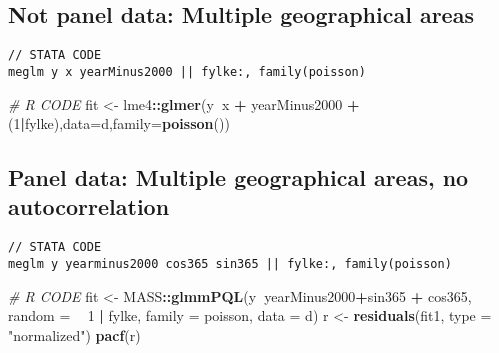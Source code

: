 \documentclass[]{book}
\newenvironment{Shaded}{\begin{snugshade}}{\end{snugshade}}
\newcommand{\KeywordTok}[1]{\textcolor[rgb]{0.13,0.29,0.53}{\textbf{#1}}}
\newcommand{\DataTypeTok}[1]{\textcolor[rgb]{0.13,0.29,0.53}{#1}}
\newcommand{\DecValTok}[1]{\textcolor[rgb]{0.00,0.00,0.81}{#1}}
\newcommand{\StringTok}[1]{\textcolor[rgb]{0.31,0.60,0.02}{#1}}
\newcommand{\CommentTok}[1]{\textcolor[rgb]{0.56,0.35,0.01}{\textit{#1}}}
\newcommand{\OperatorTok}[1]{\textcolor[rgb]{0.81,0.36,0.00}{\textbf{#1}}}
\newcommand{\NormalTok}[1]{#1}
\begin{document}
\subsection{Not panel data: Multiple geographical
areas}\label{not-panel-data-multiple-geographical-areas}

\begin{verbatim}
// STATA CODE
meglm y x yearMinus2000 || fylke:, family(poisson)
\end{verbatim}

\begin{Shaded}
\begin{Highlighting}[]
\CommentTok{# R CODE}
\NormalTok{fit <-}\StringTok{ }\NormalTok{lme4}\OperatorTok{::}\KeywordTok{glmer}\NormalTok{(y}\OperatorTok{~}\NormalTok{x }\OperatorTok{+}\StringTok{ }\NormalTok{yearMinus2000 }\OperatorTok{+}\StringTok{ }\NormalTok{(}\DecValTok{1}\OperatorTok{|}\NormalTok{fylke),}\DataTypeTok{data=}\NormalTok{d,}\DataTypeTok{family=}\KeywordTok{poisson}\NormalTok{())}
\end{Highlighting}
\end{Shaded}

\subsection{Panel data: Multiple geographical areas, no
autocorrelation}\label{panel-data-multiple-geographical-areas-no-autocorrelation}

\begin{verbatim}
// STATA CODE
meglm y yearminus2000 cos365 sin365 || fylke:, family(poisson)
\end{verbatim}

\begin{Shaded}
\begin{Highlighting}[]
\CommentTok{# R CODE}
\NormalTok{fit <-}\StringTok{ }\NormalTok{MASS}\OperatorTok{::}\KeywordTok{glmmPQL}\NormalTok{(y}\OperatorTok{~}\NormalTok{yearMinus2000}\OperatorTok{+}\NormalTok{sin365 }\OperatorTok{+}\StringTok{ }\NormalTok{cos365, }\DataTypeTok{random =} \OperatorTok{~}\StringTok{ }\DecValTok{1} \OperatorTok{|}\StringTok{ }\NormalTok{fylke,}
                \DataTypeTok{family =}\NormalTok{ poisson, }\DataTypeTok{data =}\NormalTok{ d)}
\NormalTok{r <-}\StringTok{ }\KeywordTok{residuals}\NormalTok{(fit1, }\DataTypeTok{type =} \StringTok{"normalized"}\NormalTok{)}
\KeywordTok{pacf}\NormalTok{(r)}
\end{Highlighting}
\end{Shaded}
\end{document}
